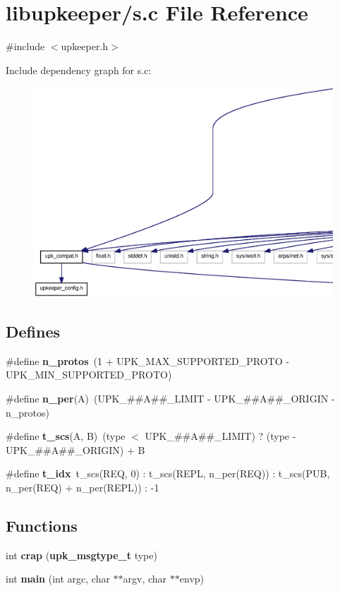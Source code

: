 \section{libupkeeper/s.c File Reference}
\label{s_8c}
{\ttfamily \#include $<$upkeeper.h$>$}\par
Include dependency graph for s.c:\nopagebreak
\begin{figure}[H]
\begin{center}
\leavevmode
\includegraphics[width=400pt]{s_8c__incl}
\end{center}
\end{figure}
\subsection*{Defines}
\begin{DoxyCompactItemize}
\item 
\#define {\bf n\_\-protos}~(1 + UPK\_\-MAX\_\-SUPPORTED\_\-PROTO -\/ UPK\_\-MIN\_\-SUPPORTED\_\-PROTO)
\item 
\#define {\bf n\_\-per}(A)~(UPK\_\-\#\#A\#\#\_\-LIMIT -\/ UPK\_\-\#\#A\#\#\_\-ORIGIN -\/ n\_\-protos)
\item 
\#define {\bf t\_\-scs}(A, B)~(type $<$ UPK\_\-\#\#A\#\#\_\-LIMIT) ? (type -\/ UPK\_\-\#\#A\#\#\_\-ORIGIN) + B
\item 
\#define {\bf t\_\-idx}~t\_\-scs(REQ, 0) : t\_\-scs(REPL, n\_\-per(REQ)) : t\_\-scs(PUB, n\_\-per(REQ) + n\_\-per(REPL)) : -\/1
\end{DoxyCompactItemize}
\subsection*{Functions}
\begin{DoxyCompactItemize}
\item 
int {\bf crap} ({\bf upk\_\-msgtype\_\-t} type)
\item 
int {\bf main} (int argc, char $\ast$$\ast$argv, char $\ast$$\ast$envp)
\end{DoxyCompactItemize}


